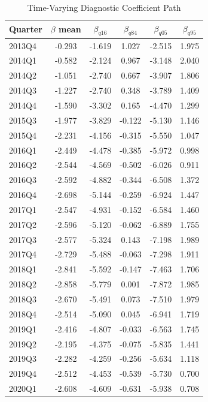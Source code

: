 \begin{table}[!htbp]
\centering
\begin{threeparttable}
 \caption{Time-Varying Diagnostic Coefficient Path}
 \label{tab:beta_t_path}
\begin{tabular}{lccccc}
\toprule
Quarter & $\beta$ mean & $\beta_{q16}$ & $\beta_{q84}$ & $\beta_{q05}$ & $\beta_{q95}$ \\
\midrule
2013Q4 & -0.293 & -1.619 & 1.027 & -2.515 & 1.975 \\
2014Q1 & -0.582 & -2.124 & 0.967 & -3.148 & 2.040 \\
2014Q2 & -1.051 & -2.740 & 0.667 & -3.907 & 1.806 \\
2014Q3 & -1.227 & -2.740 & 0.348 & -3.789 & 1.409 \\
2014Q4 & -1.590 & -3.302 & 0.165 & -4.470 & 1.299 \\
2015Q3 & -1.977 & -3.829 & -0.122 & -5.130 & 1.146 \\
2015Q4 & -2.231 & -4.156 & -0.315 & -5.550 & 1.047 \\
2016Q1 & -2.449 & -4.478 & -0.385 & -5.972 & 0.998 \\
2016Q2 & -2.544 & -4.569 & -0.502 & -6.026 & 0.911 \\
2016Q3 & -2.592 & -4.882 & -0.344 & -6.508 & 1.372 \\
2016Q4 & -2.698 & -5.144 & -0.259 & -6.924 & 1.447 \\
2017Q1 & -2.547 & -4.931 & -0.152 & -6.584 & 1.460 \\
2017Q2 & -2.596 & -5.120 & -0.062 & -6.889 & 1.755 \\
2017Q3 & -2.577 & -5.324 & 0.143 & -7.198 & 1.989 \\
2017Q4 & -2.729 & -5.488 & -0.063 & -7.298 & 1.911 \\
2018Q1 & -2.841 & -5.592 & -0.147 & -7.463 & 1.706 \\
2018Q2 & -2.858 & -5.779 & 0.001 & -7.872 & 1.985 \\
2018Q3 & -2.670 & -5.491 & 0.073 & -7.510 & 1.979 \\
2018Q4 & -2.514 & -5.090 & 0.045 & -6.941 & 1.719 \\
2019Q1 & -2.416 & -4.807 & -0.033 & -6.563 & 1.745 \\
2019Q2 & -2.195 & -4.375 & -0.075 & -5.835 & 1.441 \\
2019Q3 & -2.282 & -4.259 & -0.256 & -5.634 & 1.118 \\
2019Q4 & -2.512 & -4.453 & -0.539 & -5.730 & 0.700 \\
2020Q1 & -2.608 & -4.609 & -0.631 & -5.938 & 0.708 \\

\end{tabular}
\end{threeparttable}
\end{table}
